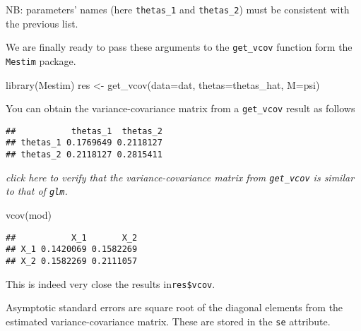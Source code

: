 \documentclass[
]{article}
\newenvironment{Shaded}{\begin{snugshade}}{\end{snugshade}}
\newcommand{\AttributeTok}[1]{\textcolor[rgb]{0.77,0.63,0.00}{#1}}
\newcommand{\FunctionTok}[1]{\textcolor[rgb]{0.00,0.00,0.00}{#1}}
\newcommand{\NormalTok}[1]{#1}
\newcommand{\OtherTok}[1]{\textcolor[rgb]{0.56,0.35,0.01}{#1}}
\newcommand{\SpecialCharTok}[1]{\textcolor[rgb]{0.00,0.00,0.00}{#1}}
\begin{document}
NB: parameters' names (here \texttt{thetas\_1} and \texttt{thetas\_2})
must be consistent with the previous list.

We are finally ready to pass these arguments to the \texttt{get\_vcov}
function form the \texttt{Mestim} package.

\begin{Shaded}
\begin{Highlighting}[]
\FunctionTok{library}\NormalTok{(Mestim)}
\NormalTok{res }\OtherTok{\textless{}{-}} \FunctionTok{get\_vcov}\NormalTok{(}\AttributeTok{data=}\NormalTok{dat, }\AttributeTok{thetas=}\NormalTok{thetas\_hat, }\AttributeTok{M=}\NormalTok{psi)}
\end{Highlighting}
\end{Shaded}

You can obtain the variance-covariance matrix from a \texttt{get\_vcov}
result as follows

\begin{Shaded}
\end{Shaded}

\begin{verbatim}
##           thetas_1  thetas_2
## thetas_1 0.1769649 0.2118127
## thetas_2 0.2118127 0.2815411
\end{verbatim}

\emph{click here to verify that the variance-covariance matrix from
\texttt{get\_vcov} is similar to that of \texttt{glm}.}

\begin{Shaded}
\begin{Highlighting}[]
\FunctionTok{vcov}\NormalTok{(mod)}
\end{Highlighting}
\end{Shaded}

\begin{verbatim}
##           X_1       X_2
## X_1 0.1420069 0.1582269
## X_2 0.1582269 0.2111057
\end{verbatim}

This is indeed very close the results in\texttt{res\$vcov}.

Asymptotic standard errors are square root of the diagonal elements from
the estimated variance-covariance matrix. These are stored in the
\texttt{se} attribute.

\begin{Shaded}
\end{Shaded}
\end{document}
